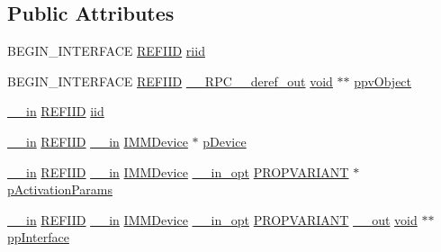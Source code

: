 \subsection*{Public Attributes}
\begin{DoxyCompactItemize}
\item 
B\+E\+G\+I\+N\+\_\+\+I\+N\+T\+E\+R\+F\+A\+CE \hyperlink{px__win__ds_8c_a80ec49c8ae61e234197d5071d2df497d}{R\+E\+F\+I\+ID} \hyperlink{struct_i_m_m_device_activator_vtbl_ae20670664252ee3a0bf2ba7c93cd5da4}{riid}
\item 
B\+E\+G\+I\+N\+\_\+\+I\+N\+T\+E\+R\+F\+A\+CE \hyperlink{px__win__ds_8c_a80ec49c8ae61e234197d5071d2df497d}{R\+E\+F\+I\+ID} \hyperlink{rpcsal_8h_a23bc188526f10656f9c79d950f6c3192}{\+\_\+\+\_\+\+R\+P\+C\+\_\+\+\_\+deref\+\_\+out} \hyperlink{sound_8c_ae35f5844602719cf66324f4de2a658b3}{void} $\ast$$\ast$ \hyperlink{struct_i_m_m_device_activator_vtbl_a031cd3b4b0c0bfe1ea0f7eaee3d18835}{ppv\+Object}
\item 
\hyperlink{sal_8h_a3f6b8655e1aa9dfc15a9029f0343009e}{\+\_\+\+\_\+in} \hyperlink{px__win__ds_8c_a80ec49c8ae61e234197d5071d2df497d}{R\+E\+F\+I\+ID} \hyperlink{struct_i_m_m_device_activator_vtbl_a34c7d096fb7af49780ec1a26a4aec0c8}{iid}
\item 
\hyperlink{sal_8h_a3f6b8655e1aa9dfc15a9029f0343009e}{\+\_\+\+\_\+in} \hyperlink{px__win__ds_8c_a80ec49c8ae61e234197d5071d2df497d}{R\+E\+F\+I\+ID} \hyperlink{sal_8h_a3f6b8655e1aa9dfc15a9029f0343009e}{\+\_\+\+\_\+in} \hyperlink{mmdeviceapi_8h_a8d4cacf41e022eb8b6aed6231bcf54be}{I\+M\+M\+Device} $\ast$ \hyperlink{struct_i_m_m_device_activator_vtbl_a3a38d77578fef9f47945ef9f19bb95ec}{p\+Device}
\item 
\hyperlink{sal_8h_a3f6b8655e1aa9dfc15a9029f0343009e}{\+\_\+\+\_\+in} \hyperlink{px__win__ds_8c_a80ec49c8ae61e234197d5071d2df497d}{R\+E\+F\+I\+ID} \hyperlink{sal_8h_a3f6b8655e1aa9dfc15a9029f0343009e}{\+\_\+\+\_\+in} \hyperlink{mmdeviceapi_8h_a8d4cacf41e022eb8b6aed6231bcf54be}{I\+M\+M\+Device} \hyperlink{sal_8h_a9c2d0f2980e51b51bb405ee2a31a3353}{\+\_\+\+\_\+in\+\_\+opt} \hyperlink{propidl_8h_ae902c1757cd16052896846fa4ebb88d8}{P\+R\+O\+P\+V\+A\+R\+I\+A\+NT} $\ast$ \hyperlink{struct_i_m_m_device_activator_vtbl_a1b445fc6c6ef36aa6d00715032049680}{p\+Activation\+Params}
\item 
\hyperlink{sal_8h_a3f6b8655e1aa9dfc15a9029f0343009e}{\+\_\+\+\_\+in} \hyperlink{px__win__ds_8c_a80ec49c8ae61e234197d5071d2df497d}{R\+E\+F\+I\+ID} \hyperlink{sal_8h_a3f6b8655e1aa9dfc15a9029f0343009e}{\+\_\+\+\_\+in} \hyperlink{mmdeviceapi_8h_a8d4cacf41e022eb8b6aed6231bcf54be}{I\+M\+M\+Device} \hyperlink{sal_8h_a9c2d0f2980e51b51bb405ee2a31a3353}{\+\_\+\+\_\+in\+\_\+opt} \hyperlink{propidl_8h_ae902c1757cd16052896846fa4ebb88d8}{P\+R\+O\+P\+V\+A\+R\+I\+A\+NT} \hyperlink{sal_8h_abb4c3c1135aab6c47cff22e7c16efb74}{\+\_\+\+\_\+out} \hyperlink{sound_8c_ae35f5844602719cf66324f4de2a658b3}{void} $\ast$$\ast$ \hyperlink{struct_i_m_m_device_activator_vtbl_a6777edf1a6a671834b69f21b47978aaf}{pp\+Interface}
\end{DoxyCompactItemize}


